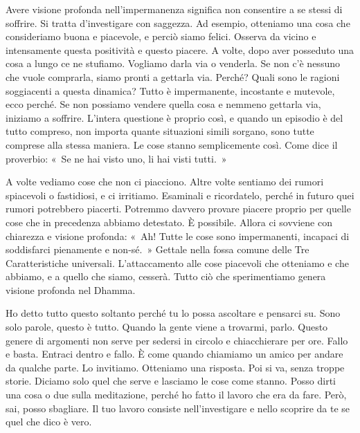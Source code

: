 Avere visione profonda nell'impermanenza significa non consentire a se
stessi di soffrire. Si tratta d'investigare con saggezza. Ad esempio,
otteniamo una cosa che consideriamo buona e piacevole, e perciò siamo
felici. Osserva da vicino e intensamente questa positività e questo
piacere. A volte, dopo aver posseduto una cosa a lungo ce ne stufiamo.
Vogliamo darla via o venderla. Se non c'è nessuno che vuole comprarla,
siamo pronti a gettarla via. Perché? Quali sono le ragioni soggiacenti a
questa dinamica? Tutto è impermanente, incostante e mutevole, ecco
perché. Se non possiamo vendere quella cosa e nemmeno gettarla via,
iniziamo a soffrire. L'intera questione è proprio così, e quando un
episodio è del tutto compreso, non importa quante situazioni simili
sorgano, sono tutte comprese alla stessa maniera. Le cose stanno
semplicemente così. Come dice il proverbio: «~Se ne hai visto uno, li
hai visti tutti.~»

A volte vediamo cose che non ci piacciono. Altre volte sentiamo dei
rumori spiacevoli o fastidiosi, e ci irritiamo. Esaminali e ricordatelo,
perché in futuro quei rumori potrebbero piacerti. Potremmo davvero
provare piacere proprio per quelle cose che in precedenza abbiamo
detestato. È possibile. Allora ci sovviene con chiarezza e visione
profonda: «~Ah! Tutte le cose sono impermanenti, incapaci di soddisfarci
pienamente e non-sé.~» Gettale nella fossa comune delle Tre
Caratteristiche universali. L'attaccamento alle cose piacevoli che
otteniamo e che abbiamo, e a quello che siamo, cesserà. Tutto ciò che
sperimentiamo genera visione profonda nel Dhamma.

Ho detto tutto questo soltanto perché tu lo possa ascoltare e pensarci
su. Sono solo parole, questo è tutto. Quando la gente viene a trovarmi,
parlo. Questo genere di argomenti non serve per sedersi in circolo e
chiacchierare per ore. Fallo e basta. Entraci dentro e fallo. È come
quando chiamiamo un amico per andare da qualche parte. Lo invitiamo.
Otteniamo una risposta. Poi si va, senza troppe storie. Diciamo solo
quel che serve e lasciamo le cose come stanno. Posso dirti una cosa o
due sulla meditazione, perché ho fatto il lavoro che era da fare. Però,
sai, posso sbagliare. Il tuo lavoro consiste nell'investigare e nello
scoprire da te se quel che dico è vero.

